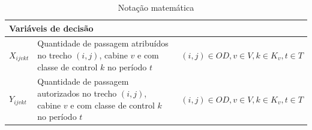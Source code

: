 \begin{table}[h]
\begin{tabular}{p{2cm} p{9.5cm} p{3.2cm}}
		\multicolumn{3}{l}{\textbf{Variáveis de decisão}}                                                                                                                              \\ \midrule
		$X_{ijvkt}$        & Quantidade de passagem atribuídos no trecho $(i,j)$, cabine $v$ e com classe de control $k$ no período $t$  & $(i,j) \in OD, v \in V, k \in K_v, t \in T$ \\
		$Y_{ijvkt}$        & Quantidade de passagem autorizados no trecho $(i,j)$, cabine $v$ e com classe de control $k$ no período $t$ & $(i,j) \in OD, v \in V, k \in K_v, t \in T$ \\ \bottomrule
	\end{tabular}
	\caption{Notação matemática}
	\label{tab: m2_definicao}
\end{table}

